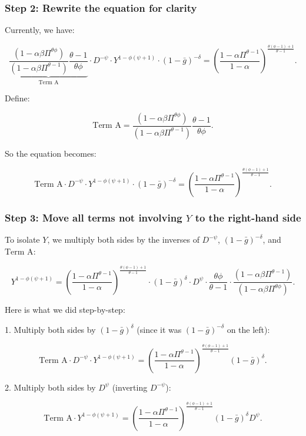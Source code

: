 \documentclass[12pt]{article}
\begin{document}
\subsubsection{Step 2: Rewrite the equation for clarity}

Currently, we have:

\[
\underbrace{\frac{(1-\alpha\beta\Pi^{\theta\phi})}{(1-\alpha\beta\Pi^{\theta-1})}\frac{\theta-1}{\theta\phi}}_{\text{Term A}} \cdot D^{-\psi} \cdot Y^{1-\phi(\psi+1)} \cdot (1-\bar{g})^{-\delta} = \left(\frac{1-\alpha\Pi^{\theta-1}}{1-\alpha}\right)^{\frac{\theta(\phi-1)+1}{\theta-1}}.
\]

Define:

\[
\text{Term A} = \frac{(1-\alpha\beta\Pi^{\theta\phi})}{(1-\alpha\beta\Pi^{\theta-1})}\frac{\theta-1}{\theta\phi}.
\]

So the equation becomes:

\[
\text{Term A} \cdot D^{-\psi} \cdot Y^{1-\phi(\psi+1)} \cdot (1-\bar{g})^{-\delta} = \left(\frac{1-\alpha\Pi^{\theta-1}}{1-\alpha}\right)^{\frac{\theta(\phi-1)+1}{\theta-1}}.
\]


\subsubsection{Step 3: Move all terms not involving $Y$ to the right-hand side}

To isolate $Y$, we multiply both sides by the inverses of $D^{-\psi}$, $(1-\bar{g})^{-\delta}$, and $\text{Term A}$:

\[
Y^{1-\phi(\psi+1)} = \left(\frac{1-\alpha\Pi^{\theta-1}}{1-\alpha}\right)^{\frac{\theta(\phi-1)+1}{\theta-1}} \cdot (1-\bar{g})^{\delta} \cdot D^{\psi} \cdot \frac{\theta\phi}{\theta-1} \cdot \frac{(1-\alpha\beta\Pi^{\theta-1})}{(1-\alpha\beta\Pi^{\theta\phi})}.
\]

Here is what we did step-by-step:

1. Multiply both sides by $(1-\bar{g})^{\delta}$ (since it was $(1-\bar{g})^{-\delta}$ on the left):

\[
\text{Term A} \cdot D^{-\psi} \cdot Y^{1-\phi(\psi+1)} = \left(\frac{1-\alpha\Pi^{\theta-1}}{1-\alpha}\right)^{\frac{\theta(\phi-1)+1}{\theta-1}} (1-\bar{g})^{\delta}.
\]

2. Multiply both sides by $D^{\psi}$ (inverting $D^{-\psi}$):

\[
\text{Term A} \cdot Y^{1-\phi(\psi+1)} = \left(\frac{1-\alpha\Pi^{\theta-1}}{1-\alpha}\right)^{\frac{\theta(\phi-1)+1}{\theta-1}} (1-\bar{g})^{\delta} D^{\psi}.
\]
\end{document}
